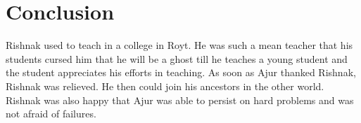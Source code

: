 \chapter{Conclusion}
 Rishnak used to teach in a college in Royt. He was such a mean 
teacher that his students cursed him that he will be a ghost till he teaches a young student and the student
appreciates his efforts in teaching. As soon as Ajur thanked Rishnak, Rishnak was relieved. He then could join his ancestors in the other world. Rishnak was also happy that Ajur was able to persist on hard problems and was not afraid of failures.

